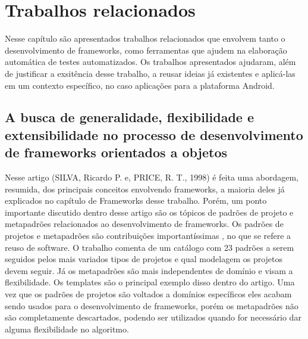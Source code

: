 \documentclass[
    12pt,       %
    openright,      %
    twoside,      %
    a4paper,      %
    english,      %
    french,       %
    spanish,      %
    brazil,       %
    ]{abntex2}
\begin{document}
  \chapter{Trabalhos relacionados}
    Nesse capítulo são apresentados trabalhos relacionados que envolvem tanto o desenvolvimento de frameworks,
    como ferramentas que ajudem na elaboração automática de testes automatizados. Os trabalhos apresentados
    ajudaram, além de justificar a exsitência desse trabalho, a reusar ideias já existentes e aplicá-las em um
    contexto específico, no caso aplicações para a plataforma Android.

    \section{A busca de generalidade, flexibilidade e extensibilidade no processo de desenvolvimento de frameworks orientados a objetos}
      Nesse artigo (SILVA, Ricardo P. e, PRICE, R. T., 1998) é feita uma abordagem, resumida, dos principais conceitos envolvendo frameworks, a
      maioria deles já explicados no capítulo de Frameworks desse trabalho. Porém, um ponto importante
      discutido dentro desse artigo são os tópicos de padrões de projeto e metapadrões relacionados
      ao desenvolvimento de frameworks. Os padrões de projetos e metapadrões são contribuições
      importantíssimas , no que se refere a reuso de software. O trabalho comenta de um catálogo com
      23 padrões a serem seguidos pelos mais variados tipos de projetos e qual modelagem os projetos devem
      seguir. Já os metapadrões são mais independentes de domínio e visam a flexibilidade. Os templates são o
      principal exemplo disso dentro do artigo. Uma vez que os padrões de projetos são voltados a domínios
      específicos eles acabam sendo usados para o desenvolvimento de frameworks, porém os metapadrões não são
      completamente descartados, podendo ser utilizados quando for necessário dar alguma flexibilidade no
      algoritmo.
\end{document}
